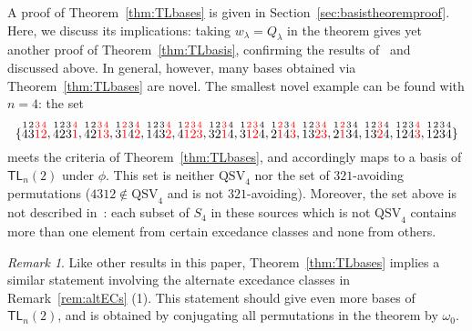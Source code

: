 \documentclass[12pt]{amsart}
\theoremstyle{definition}
\theoremstyle{remark}
\newtheorem{rem}[equation]{Remark}
\numberwithin{equation}{section}
\newcommand{\TL}{\mathsf{TL}}
\newcommand{\QSV}{\mathrm{QSV}}
\begin{document}
A proof of Theorem~\ref{thm:TLbases} is given in Section~\ref{sec:basistheoremproof}.  Here, we discuss its implications: taking $w_{\lambda} = Q_{\lambda}$ in the theorem gives yet another proof of Theorem~\ref{thm:TLbasis}, confirming the results of~\cite{GobetWilliams} and~\cite{Zinno} discussed above.  In general, however, many bases obtained via Theorem~\ref{thm:TLbases} are novel.  The smallest novel example can be found with $n = 4$: the set 
\[
\{
\stackrel{1}{4} \stackrel{2}{3} \color{red} \stackrel{3}{1} \stackrel{4}{2} \color{black}, 
\stackrel{1}{4} \stackrel{2}{2} \stackrel{3}{3}  \color{red} \stackrel{4}{1} \color{black}, 
\stackrel{1}{4} \stackrel{2}{2}\color{red}  \stackrel{3}{1} \stackrel{4}{3} \color{black}, 
\stackrel{1}{3} \color{red}  \stackrel{2}{1} \color{black} \stackrel{3}{4} \color{red} \stackrel{4}{2}\color{black} , 
\stackrel{1}{1} \stackrel{2}{4} \stackrel{3}{3} \color{red} \stackrel{4}{2} \color{black}, 
\stackrel{1}{4} \color{red} \stackrel{2}{1} \stackrel{3}{2} \stackrel{4}{3} \color{black}, 
\stackrel{1}{3} \stackrel{2}{2} \color{red} \stackrel{3}{1} \color{black} \stackrel{4}{4}, 
\stackrel{1}{3} \color{red} \stackrel{2}{1} \stackrel{3}{2} \color{black} \stackrel{4}{4}, 
\stackrel{1}{2} \color{red} \stackrel{2}{1} \color{black} \stackrel{3}{4} \color{red} \stackrel{4}{3} \color{black}, 
\stackrel{1}{1} \stackrel{2}{3} \color{red} \stackrel{3}{2} \stackrel{4}{3} \color{black}, 
\stackrel{1}{2}  \color{red} \stackrel{2}{1} \color{black} \stackrel{3}{3} \stackrel{4}{4}, 
\stackrel{1}{1} \stackrel{2}{3} \color{red} \stackrel{3}{2} \color{black} \stackrel{4}{4}, 
\stackrel{1}{1} \stackrel{2}{2} \stackrel{3}{4}  \color{red} \stackrel{4}{3} \color{black},
\stackrel{1}{1} \stackrel{2}{2} \stackrel{3}{3} \stackrel{4}{4}
\}
\]
meets the criteria of Theorem~\ref{thm:TLbases}, and accordingly maps to a basis of $\TL_{n}(2)$ under $\phi$. 
This set is neither $\QSV_{4}$ nor the set of $321$-avoiding permutations ($4312 \notin \QSV_{4}$ and is not $321$-avoiding).
Moreover, the set above is not described in~\cite{GobetWilliams, Zinno}: each subset of $S_{4}$ in these sources which is not $\QSV_{4}$ contains more than one element from certain excedance classes and none from others.  
 
\begin{rem}
Like other results in this paper, Theorem~\ref{thm:TLbases} implies a similar statement involving the alternate excedance classes in Remark~\ref{rem:altECs} (1).  This statement should give even more bases of $\TL_{n}(2)$, and is obtained by conjugating all permutations in the theorem by $\omega_0$.
\end{rem}
\end{document}
